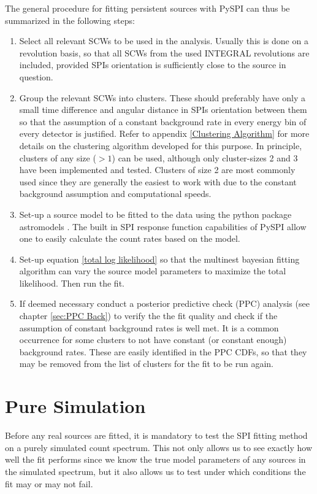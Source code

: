 \documentclass{report}
\begin{document}
The general procedure for fitting persistent sources with PySPI can thus be summarized in the following steps:
\begin{enumerate}
  \item Select all relevant SCWs to be used in the analysis. Usually this is done on a revolution basis, so that all SCWs from the used INTEGRAL revolutions are included, provided SPIs orientation is sufficiently close to the source in question.
  \item Group the relevant SCWs into clusters. These should preferably have only a small time difference and angular distance in SPIs orientation between them so that the assumption of a constant background rate in every energy bin of every detector is justified. Refer to appendix \ref{Clustering Algorithm} for more details on the clustering algorithm developed for this purpose. In principle, clusters of any size ($>1$) can be used, although only cluster-sizes 2 and 3 have been implemented and tested. Clusters of size 2 are most commonly used since they are generally the easiest to work with due to the constant background assumption and computational speeds.
  \item Set-up a source model to be fitted to the data using the python package astromodels \cite{astromodels}. The built in SPI response function capabilities of PySPI allow one to easily calculate the count rates based on the model.
  \item Set-up equation \ref{total log likelihood} so that the multinest bayesian fitting algorithm can vary the source model parameters to maximize the total likelihood. Then run the fit.
  \item If deemed necessary conduct a posterior predictive check (PPC) analysis (see chapter \ref{sec:PPC Back}) to verify the the fit quality and check if the assumption of constant background rates is well met. It is a common occurrence for some clusters to not have constant (or constant enough) background rates. These are easily identified in the PPC CDFs, so that they may be removed from the list of clusters for the fit to be run again.
\end{enumerate}



\section{Pure Simulation}\label{sec: pure sim}
Before any real sources are fitted, it is mandatory to test the SPI fitting method on a purely simulated count spectrum. This not only allows us to see exactly how well the fit performs since we know the true model parameters of any sources in the simulated spectrum, but it also allows us to test under which conditions the fit may or may not fail.
\end{document}
